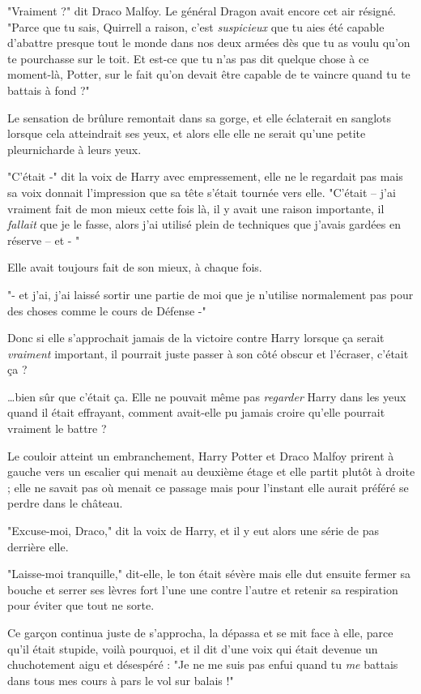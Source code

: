 "Vraiment ?" dit Draco Malfoy. Le général Dragon avait encore cet air résigné. "Parce que tu sais, Quirrell a raison, c'est \emph{suspicieux}  que tu aies été capable d'abattre presque tout le monde dans nos deux armées dès que tu as voulu qu'on te pourchasse sur le toit. Et est-ce que tu n'as pas dit quelque chose à ce moment-là, Potter, sur le fait qu'on devait être capable de te vaincre quand tu te battais à fond ?"

Le sensation de brûlure remontait dans sa gorge, et elle éclaterait en sanglots lorsque cela atteindrait ses yeux, et alors elle elle ne serait qu'une petite pleurnicharde à leurs yeux.

"C'était -" dit la voix de Harry avec empressement, elle ne le regardait pas mais sa voix donnait l'impression que sa tête s'était tournée vers elle. "C'était – j'ai vraiment fait de mon mieux cette fois là, il y avait une raison importante, il \emph{fallait}  que je le fasse, alors j'ai utilisé plein de techniques que j'avais gardées en réserve – et - "

Elle avait toujours fait de son mieux, à chaque fois.

"- et j'ai, j'ai laissé sortir une partie de moi que je n'utilise normalement pas pour des choses comme le cours de Défense -"

Donc si elle s'approchait jamais de la victoire contre Harry lorsque ça serait \emph{vraiment}  important, il pourrait juste passer à son côté obscur et l'écraser, c'était ça ?

…bien sûr que c'était ça. Elle ne pouvait même pas \emph{regarder}  Harry dans les yeux quand il était effrayant, comment avait-elle pu jamais croire qu'elle pourrait vraiment le battre ?

Le couloir atteint un embranchement, Harry Potter et Draco Malfoy prirent à gauche vers un escalier qui menait au deuxième étage et elle partit plutôt à droite ; elle ne savait pas où menait ce passage mais pour l'instant elle aurait préféré se perdre dans le château.

"Excuse-moi, Draco," dit la voix de Harry, et il y eut alors une série de pas derrière elle.

"Laisse-moi tranquille," dit-elle, le ton était sévère mais elle dut ensuite fermer sa bouche et serrer ses lèvres fort l'une une contre l'autre et retenir sa respiration pour éviter que tout ne sorte.

Ce garçon continua juste de s'approcha, la dépassa et se mit face à elle, parce qu'il était stupide, voilà pourquoi, et il dit d'une voix qui était devenue un chuchotement aigu et désespéré : "Je ne me suis pas enfui quand tu \emph{me}  battais dans tous mes cours à pars le vol sur balais !"

